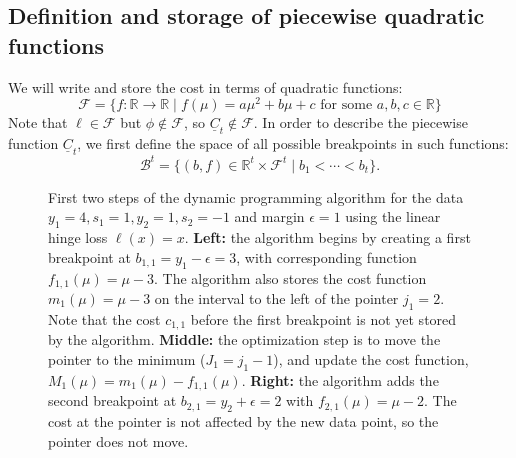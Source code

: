 \documentclass{article}
\begin{document}
\subsection{Definition and storage of piecewise quadratic functions}
We will write and store the cost in terms of quadratic
functions:
\begin{equation}
  \label{eq:F}
  \mathcal F = \{
  f:\mathbb R \rightarrow \mathbb R\mid
  f(\mu) = a\mu^2 + b\mu + c 
  \text{ for some }a,b,c\in\mathbb R
  \}
\end{equation}
Note that $\ell\in\mathcal F$ but $\phi\not\in\mathcal F$, so
$\underline C_t\not\in \mathcal F$. In order to describe the piecewise
function $\underline C_t$, we first define the space of all
possible breakpoints in such functions:
\begin{equation}
  \label{eq:B^t}
  \mathcal B^t = \{
  (b,f)\in\mathbb R^t\times \mathcal F^t \mid
  b_1 < \cdots < b_t
  \}.
\end{equation}

\begin{figure*}
  \hskip -0.3cm
  
  \vskip -0.8cm
  \caption{First two steps of the dynamic programming algorithm for
    the data $y_1=4, s_1=1, y_2=1, s_2=-1$ and margin $\epsilon=1$
    using the linear hinge loss $\ell(x)=x$. \textbf{Left:} the
    algorithm begins by creating a first breakpoint at
    $b_{1,1}=y_1-\epsilon=3$, with corresponding function
    $f_{1,1}(\mu)=\mu-3$. The algorithm also stores the cost function
    $m_1(\mu)=\mu-3$ on the interval to the left of the pointer
    $j_1=2$. Note that the cost $c_{1,1}$ before the first breakpoint
    is not yet stored by the algorithm. \textbf{Middle:} the
    optimization step is to move the pointer to the minimum
    ($J_1=j_1-1$), and update the cost function,
    $M_1(\mu)=m_1(\mu) -f_{1,1}(\mu)$.  \textbf{Right:} the algorithm
    adds the second breakpoint at $b_{2,1}=y_2+\epsilon=2$ with
    $f_{2,1}(\mu)=\mu-2$. The cost at the pointer is not affected by
    the new data point, so the pointer does not move.}
  \label{fig:algorithm-steps}
\end{figure*}
\end{document}
